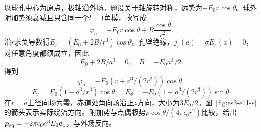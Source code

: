 \begin{solution}
以球孔中心为原点，极轴沿外场。题设关于轴旋转对称，远势为$-E_0r\cos\theta$。球外附加势须衰减且只含同一个$l=1$角模，故写成
\[\varphi_o=-E_0r\cos\theta+B\frac{\cos\theta}{r^2}.
\]
沿$r$求负导数得$E_r=(E_0+2B/r^3)\cos\theta$。孔壁绝缘，$j_r(a)=\sigma E_r(a)=0$，对任意角度都须成立，因此
\[E_0+2B/a^3=0,\quad B=-E_0a^3/2.
\]
得到
\[\boxed{\varphi_o=-E_0(r+a^3/(2r^2))\cos\theta},
\]
\[\boxed{E_r=E_0(1-a^3/r^3)\cos\theta,\quad
E_\theta=-E_0(1+a^3/(2r^3))\sin\theta}.
\]
在$r=a$上径向场为零，赤道处角向场沿正$z$方向，大小为$3E_0/2$。图~\ref{fig:es3-e11-s}的箭头表示实际绕流方向。附加势与点偶极势$p\cos\theta/(4\pi\epsilon_0r^2)$比较，给出$\bm{p}_{\rm eq}=-2\pi\epsilon_0a^3E_0\bm{e}_z$，与外场反向。
\begin{figure}[H]\centering
\begin{tikzpicture}[>=Stealth,line cap=round,line join=round]

\end{tikzpicture}
\end{figure}
\end{solution}
